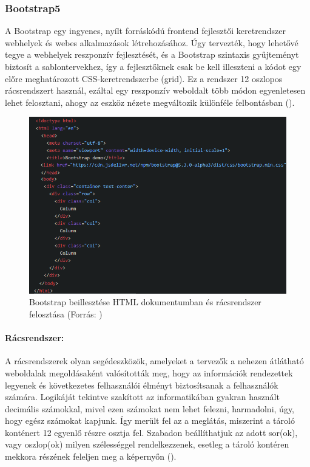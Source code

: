 \subsubsection{Bootstrap5}

A Bootstrap egy ingyenes, nyílt forráskódú frontend fejlesztői keretrendszer webhelyek és webes alkalmazások létrehozásához. Úgy tervezték, hogy lehetővé tegye a webhelyek reszponzív fejlesztését, és a Bootstrap szintaxis gyűjteményt biztosít a sablontervekhez, így a fejlesztőknek csak be kell illeszteni a kódot egy előre meghatározott CSS-keretrendszerbe (grid). Ez a rendszer 12 oszlopos rácsrendszert használ, ezáltal egy reszponzív weboldalt több módon egyenletesen lehet felosztani, ahogy az eszköz nézete megváltozik különféle felbontásban ().

\begin{figure}[h]
\centering
\includegraphics[scale=0.5]{images/bootstrap.png}
\caption{Bootstrap beillesztése HTML dokumentumban és rácsrendszer felosztása (Forrás: \cite{Bootstrap})}
\label{fig:bootstrap}
\end{figure}

\pagebreak

\paragraph{Rácsrendszer:}

A rácsrendszerek olyan segédeszközök, amelyeket a tervezők a nehezen átlátható weboldalak megoldásaként valósították meg, hogy az információk rendezettek legyenek és következetes felhasználói élményt biztosítsanak a felhasználók számára. Logikáját tekintve szakított az informatikában gyakran használt decimális számokkal, mivel ezen számokat nem lehet felezni, harmadolni, úgy, hogy egész számokat kapjunk. Így merült fel az a meglátás, miszerint a tároló konténert 12 egyenlő részre osztja fel. Szabadon beállíthatjuk az adott sor(ok), vagy oszlop(ok) milyen szélességgel rendelkezzenek, esetleg a tároló kontéren mekkora részének feleljen meg a képernyőn ().

